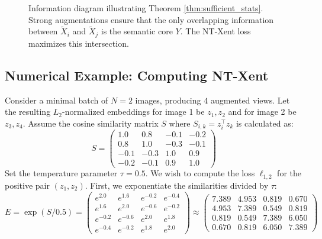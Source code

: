 \begin{figure}[htbp]
\centering
{}
\caption{Information diagram illustrating Theorem \ref{thm:sufficient_stats}. Strong augmentations ensure that the only overlapping information between $\tilde{X}_i$ and $\tilde{X}_j$ is the semantic core $Y$. The NT-Xent loss maximizes this intersection.}
\label{fig:info_venn}
\end{figure}

\subsection{Numerical Example: Computing NT-Xent}

Consider a minimal batch of $N=2$ images, producing $4$ augmented views. Let the resulting $L_2$-normalized embeddings for image 1 be $z_1, z_2$ and for image 2 be $z_3, z_4$.
Assume the cosine similarity matrix $S$ where $S_{i,k} = z_i^\top z_k$ is calculated as:
\begin{equation}
S = \begin{pmatrix}
1.0 & 0.8 & -0.1 & -0.2 \\
0.8 & 1.0 & -0.3 & -0.1 \\
-0.1 & -0.3 & 1.0 & 0.9 \\
-0.2 & -0.1 & 0.9 & 1.0 
\end{pmatrix}
\end{equation}
Set the temperature parameter $\tau = 0.5$. We wish to compute the loss $\ell_{1,2}$ for the positive pair $(z_1, z_2)$.
First, we exponentiate the similarities divided by $\tau$:
\begin{equation}
E = \exp(S / 0.5) = \begin{pmatrix}
e^{2.0} & e^{1.6} & e^{-0.2} & e^{-0.4} \\
e^{1.6} & e^{2.0} & e^{-0.6} & e^{-0.2} \\
e^{-0.2} & e^{-0.6} & e^{2.0} & e^{1.8} \\
e^{-0.4} & e^{-0.2} & e^{1.8} & e^{2.0}
\end{pmatrix}
\approx \begin{pmatrix}
7.389 & 4.953 & 0.819 & 0.670 \\
4.953 & 7.389 & 0.549 & 0.819 \\
0.819 & 0.549 & 7.389 & 6.050 \\
0.670 & 0.819 & 6.050 & 7.389
\end{pmatrix}
\end{equation}

